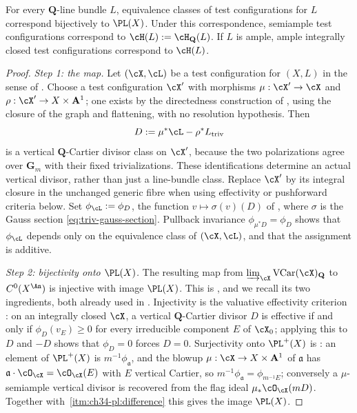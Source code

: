 \begin{theorem}\label{thm:tc-pl-correspondence}
For every $\mathbf Q$-line bundle $L$, equivalence classes of test
configurations for $L$ correspond bijectively to $\PL(X)$.  Under this
correspondence, semiample test configurations correspond to
$\cH(L):=\cH_{\mathbf Q}(L)$.  If $L$ is ample, ample integrally closed
test configurations correspond to $\cH(L)$.
\end{theorem}

\begin{proof}
\emph{Step 1: the map.}  Let $(\cX,\cL)$ be a test configuration for
$(X,L)$ in the sense of .  Choose a test
configuration $\cX'$ with morphisms $\mu:\cX'\to\cX$ and
$\rho:\cX'\to X\times\mathbf A^1$; one exists by the directedness
construction of , using the closure of the
graph and flattening, with no resolution hypothesis.  Then
\[
 D:=\mu^*\cL-\rho^*L_{\mathrm{triv}}
\]
is a vertical $\mathbf Q$-Cartier divisor class on $\cX'$, because the
two polarizations agree over $\mathbf G_m$ with their fixed
trivializations.  These identifications determine an actual vertical
divisor, rather than just a line-bundle class.  Replace $\cX'$ by its
integral closure in the unchanged generic fibre when using effectivity
or pushforward criteria below.  Set
$\phi_{\cL}:=\phi_D$, the function $v\mapsto\sigma(v)(D)$ of
, where $\sigma$ is the Gauss section
\eqref{eq:triv-gauss-section}.  Pullback invariance
$\phi_{\mu^*D}=\phi_D$ shows that $\phi_{\cL}$ depends only on the
equivalence class of $(\cX,\cL)$, and that the assignment is additive.

\emph{Step 2: bijectivity onto $\PL(X)$.}  The resulting map from
$\varinjlim_{\cX}\operatorname{VCar}(\cX)_{\mathbf Q}$ to
$C^0(X^{\An})$ is injective with image $\PL(X)$.  This is
\cite[Theorem~2.7]{BJ22}, and we recall its two ingredients, both already
used in .  Injectivity is the valuative
effectivity criterion \cite[Lemma~2.8]{BJ22}: on an integrally closed
$\cX$, a vertical $\mathbf Q$-Cartier divisor $D$ is effective if and
only if $\phi_D(v_E)\ge0$ for every irreducible component $E$ of
$\cX_0$; applying this to $D$ and $-D$ shows that $\phi_D=0$ forces
$D=0$.  Surjectivity onto $\PL^+(X)$ is \cite[Lemma~2.9]{BJ22}: an
element of $\PL^+(X)$ is $m^{-1}\phi_{\mathfrak a}$, and the blowup
$\mu:\cX\to X\times\mathbf A^1$ of $\mathfrak a$ has
$\mathfrak a\cdot\cO_{\cX}=\cO_{\cX}(E)$ with $E$ vertical Cartier, so
$m^{-1}\phi_{\mathfrak a}=\phi_{m^{-1}E}$; conversely a
$\mu$-semiample vertical divisor is recovered from the flag ideal
$\mu_*\cO_{\cX}(mD)$.  Together with
\,\cref{itm:ch34-pl:difference} this gives the
image $\PL(X)$.


\end{proof}
